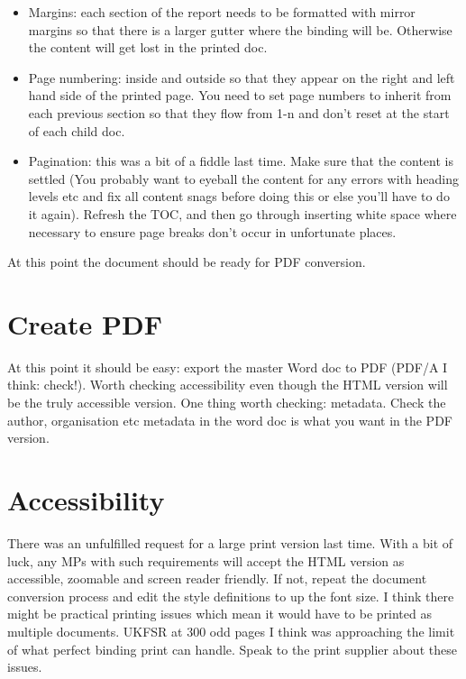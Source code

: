\documentclass[
]{book}
\providecommand{\tightlist}{%
  \setlength{\itemsep}{0pt}\setlength{\parskip}{0pt}}
\begin{document}
\begin{itemize}
\tightlist
\item
  Margins: each section of the report needs to be formatted with mirror margins so that there is a larger gutter where the binding will be. Otherwise the content will get lost in the printed doc.
\item
  Page numbering: inside and outside so that they appear on the right and left hand side of the printed page. You need to set page numbers to inherit from each previous section so that they flow from 1-n and don't reset at the start of each child doc.
\item
  Pagination: this was a bit of a fiddle last time. Make sure that the content is settled (You probably want to eyeball the content for any errors with heading levels etc and fix all content snags before doing this or else you'll have to do it again). Refresh the TOC, and then go through inserting white space where necessary to ensure page breaks don't occur in unfortunate places.
\end{itemize}

At this point the document should be ready for PDF conversion.

\hypertarget{create-pdf}{%
\section{Create PDF}\label{create-pdf}}

At this point it should be easy: export the master Word doc to PDF (PDF/A I think: check!). Worth checking accessibility even though the HTML version will be the truly accessible version. One thing worth checking: metadata. Check the author, organisation etc metadata in the word doc is what you want in the PDF version.

\hypertarget{accessibility}{%
\section{Accessibility}\label{accessibility}}

There was an unfulfilled request for a large print version last time. With a bit of luck, any MPs with such requirements will accept the HTML version as accessible, zoomable and screen reader friendly. If not, repeat the document conversion process and edit the style definitions to up the font size. I think there might be practical printing issues which mean it would have to be printed as multiple documents. UKFSR at 300 odd pages I think was approaching the limit of what perfect binding print can handle. Speak to the print supplier about these issues.
\end{document}
